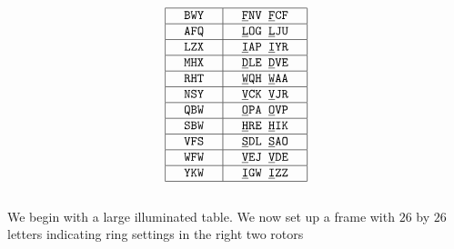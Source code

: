 \[
  \setlength{\arraycolsep}{15pt}
  \begin{array}{|c | c|}
    \hline
    \texttt{BWY} & \texttt{}{\uline{\texttt{F}}}\texttt{NV
    }{\uline{\texttt{F}}}\texttt{CF}                       \\
    \hline
    \texttt{AFQ} & \texttt{}{\uline{\texttt{L}}}\texttt{OG
    }{\uline{\texttt{L}}}\texttt{JU}                       \\
    \hline
    \texttt{LZX} & \texttt{}{\uline{\texttt{I}}}\texttt{AP
    }{\uline{\texttt{I}}}\texttt{YR}                       \\
    \hline
    \texttt{MHX} & \texttt{}{\uline{\texttt{D}}}\texttt{LE
    }{\uline{\texttt{D}}}\texttt{VE}                       \\
    \hline
    \texttt{RHT} & \texttt{}{\uline{\texttt{W}}}\texttt{QH
    }{\uline{\texttt{W}}}\texttt{AA}                       \\
    \hline
    \texttt{NSY} & \texttt{}{\uline{\texttt{V}}}\texttt{CK
    }{\uline{\texttt{V}}}\texttt{JR}                       \\
    \hline
    \texttt{QBW} & \texttt{}{\uline{\texttt{O}}}\texttt{PA
    }{\uline{\texttt{O}}}\texttt{VP}                       \\
    \hline
    \texttt{SBW} & \texttt{}{\uline{\texttt{H}}}\texttt{RE
    }{\uline{\texttt{H}}}\texttt{IK}                       \\
    \hline
    \texttt{VFS} & \texttt{}{\uline{\texttt{S}}}\texttt{DL
    }{\uline{\texttt{S}}}\texttt{AO}                       \\
    \hline
    \texttt{WFW} & \texttt{}{\uline{\texttt{V}}}\texttt{EJ
    }{\uline{\texttt{V}}}\texttt{DE}                       \\
    \hline
    \texttt{YKW} & \texttt{}{\uline{\texttt{I}}}\texttt{GW
    }{\uline{\texttt{I}}}\texttt{ZZ}                       \\
    \hline
  \end{array}
\]
\\We begin with a large illuminated table. We now set up a frame with
$26$ by $26$ letters indicating ring settings in the right two rotors
